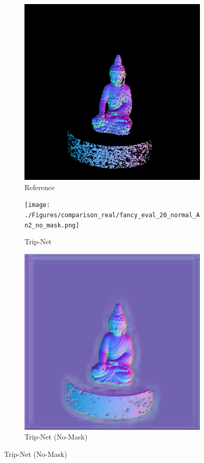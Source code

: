 \begin{figure}[H]
	\centering
	\captionsetup{width=\linewidth}
	\begin{subfigure}[b]{0.32\linewidth}
		\includegraphics[width=\linewidth]{./Figures/comparison_real/fancy_eval_20_groundtruth.png}
		\caption{Reference}
	\end{subfigure}
	\begin{subfigure}[b]{0.32\linewidth}
	\texttt{[image: ./Figures/comparison\_real/fancy\_eval\_20\_normal\_An2\_no\_mask.png]}
	\caption{Trip-Net}
	\end{subfigure}
	\begin{subfigure}[b]{0.32\linewidth}
		\includegraphics[width=\linewidth]{./Figures/comparison_real/fancy_eval_20_normal_An2-real-resume-616.png}
		\caption{Trip-Net (No-Mask)}
	\end{subfigure}
	

\end{figure}
